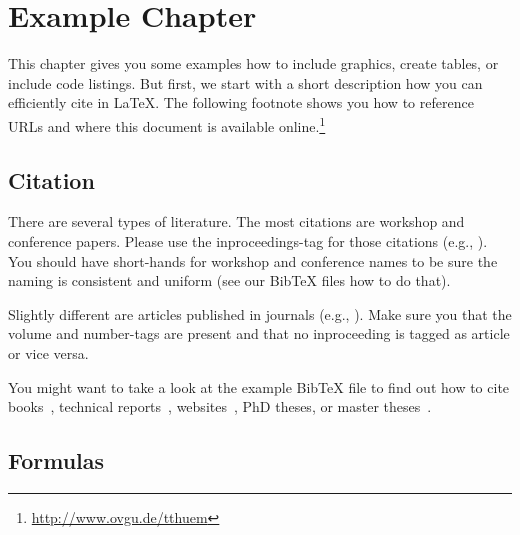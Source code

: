 \chapter{Example Chapter}
\label{ch:example}

This chapter gives you some examples how to include graphics, create tables, or include code listings. But first, we start with a short description how you can efficiently cite in \LaTeX. The following footnote shows you how to reference URLs and where this document is available online.\footnote{\url{http://www.ovgu.de/tthuem}}

%
%

\section{Citation}

There are several types of literature. The most citations are workshop and conference papers. Please use the inproceedings-tag for those citations (e.g., \cite{KAK:GPCE09}). You should have short-hands for workshop and conference names to be sure the naming is consistent and uniform (see our BibTeX files how to do that).

Slightly different are articles published in journals (e.g., \cite{KG:SME06}). Make sure you that the volume and number-tags are present and that no inproceeding is tagged as article or vice versa.

You might want to take a look at the example BibTeX file to find out how to cite books~\cite{CE:BOOK00}, technical reports~\cite{KCHNP:TR90}, websites~\cite{Coq:website}, PhD theses, or master theses~\cite{B:PHD03,R:MT09}.

\section{Formulas}

